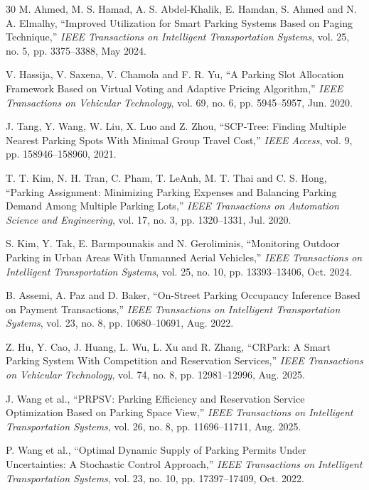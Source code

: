 \begin{thebibliography}{30}
M. Ahmed, M. S. Hamad, A. S. Abdel-Khalik, E. Hamdan, S. Ahmed and N. A. Elmalhy, ``Improved Utilization for Smart Parking Systems Based on Paging Technique,'' \emph{IEEE Transactions on Intelligent Transportation Systems}, vol. 25, no. 5, pp. 3375--3388, May 2024.

V. Hassija, V. Saxena, V. Chamola and F. R. Yu, ``A Parking Slot Allocation Framework Based on Virtual Voting and Adaptive Pricing Algorithm,'' \emph{IEEE Transactions on Vehicular Technology}, vol. 69, no. 6, pp. 5945--5957, Jun. 2020.

J. Tang, Y. Wang, W. Liu, X. Luo and Z. Zhou, ``SCP-Tree: Finding Multiple Nearest Parking Spots With Minimal Group Travel Cost,'' \emph{IEEE Access}, vol. 9, pp. 158946--158960, 2021.

T. T. Kim, N. H. Tran, C. Pham, T. LeAnh, M. T. Thai and C. S. Hong, ``Parking Assignment: Minimizing Parking Expenses and Balancing Parking Demand Among Multiple Parking Lots,'' \emph{IEEE Transactions on Automation Science and Engineering}, vol. 17, no. 3, pp. 1320--1331, Jul. 2020.

S. Kim, Y. Tak, E. Barmpounakis and N. Geroliminis, ``Monitoring Outdoor Parking in Urban Areas With Unmanned Aerial Vehicles,'' \emph{IEEE Transactions on Intelligent Transportation Systems}, vol. 25, no. 10, pp. 13393--13406, Oct. 2024.

B. Assemi, A. Paz and D. Baker, ``On-Street Parking Occupancy Inference Based on Payment Transactions,'' \emph{IEEE Transactions on Intelligent Transportation Systems}, vol. 23, no. 8, pp. 10680--10691, Aug. 2022.

Z. Hu, Y. Cao, J. Huang, L. Wu, L. Xu and R. Zhang, ``CRPark: A Smart Parking System With Competition and Reservation Services,'' \emph{IEEE Transactions on Vehicular Technology}, vol. 74, no. 8, pp. 12981--12996, Aug. 2025.

J. Wang et al., ``PRPSV: Parking Efficiency and Reservation Service Optimization Based on Parking Space View,'' \emph{IEEE Transactions on Intelligent Transportation Systems}, vol. 26, no. 8, pp. 11696--11711, Aug. 2025.

P. Wang et al., ``Optimal Dynamic Supply of Parking Permits Under Uncertainties: A Stochastic Control Approach,'' \emph{IEEE Transactions on Intelligent Transportation Systems}, vol. 23, no. 10, pp. 17397--17409, Oct. 2022.


\end{thebibliography}
